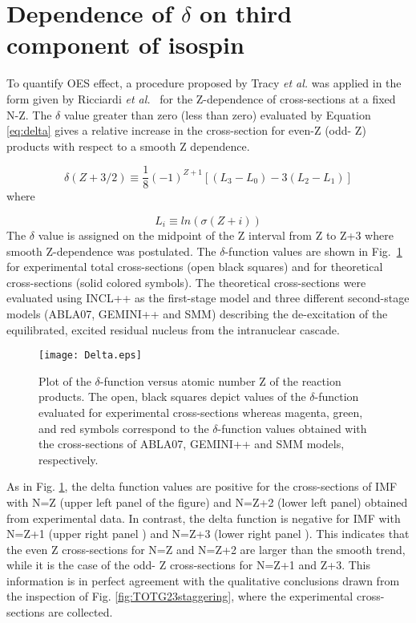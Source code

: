 \section{Dependence of $\delta$ on third component of isospin}\label{quanti_theory}
To quantify OES effect, a procedure proposed by Tracy \emph{et al.} \cite{TRA72A} was applied in the form given by Ricciardi \emph{et al.}~\cite{RICCIARDI2004299_OES} for the Z-dependence of cross-sections at a fixed N-Z. The $\delta$  value greater than zero (less than zero) evaluated by Equation \ref{eq:delta} gives a relative increase in the cross-section for even-Z (odd- Z) products with respect to a smooth Z dependence.

\begin{equation}\label{eq:delta}
\delta \left( {Z + 3/2} \right) \equiv \frac{1}{8}\left( { - 1}
\right)^{Z + 1} \left[ {\left( {L_3  - L_0 } \right) - 3\left( {L_2
- L_1 } \right)} \right]
\end{equation}
%
where

\[
L_i \equiv  ln (\sigma\left( Z+i \right))
\]
%
The $\delta$ value is assigned on the midpoint of the Z interval from Z to Z+3 where smooth Z-dependence was postulated.
The $\delta$-function values are shown in Fig.~\ref{Fig:Deltavsz} for experimental total cross-sections (open black squares) and for theoretical cross-sections (solid colored symbols). The theoretical cross-sections were evaluated using INCL++ as the first-stage model and three different second-stage models (ABLA07, GEMINI++ and SMM) describing the de-excitation of the equilibrated, excited residual nucleus from the intranuclear cascade. 
%
\begin{figure}[!h]
\centering
\texttt{[image: Delta.eps]}
\caption{Plot of the $\delta$-function versus atomic number Z of the
reaction products. The open, black squares depict values of the
$\delta$-function evaluated for experimental cross-sections whereas
magenta, green, and red symbols correspond to the $\delta$-function
values obtained with the cross-sections of ABLA07, GEMINI++ and SMM
models, respectively.} \label{Fig:Deltavsz}
\end{figure}
As in Fig. \ref{Fig:Deltavsz}, the delta function values are positive for the cross-sections of IMF with N=Z (upper left panel of the figure) and N=Z+2
(lower left panel) obtained from experimental data. In contrast, the delta function is negative for
IMF with N=Z+1 (upper right panel ) and N=Z+3 (lower right panel ). This indicates that the even Z cross-sections for N=Z and N=Z+2 are larger than the smooth trend, while it is the case of the odd- Z cross-sections for N=Z+1 and Z+3. This information is in perfect agreement with the qualitative conclusions drawn from the inspection of Fig. \ref{fig:TOTG23staggering}, where the experimental cross-sections are collected.

